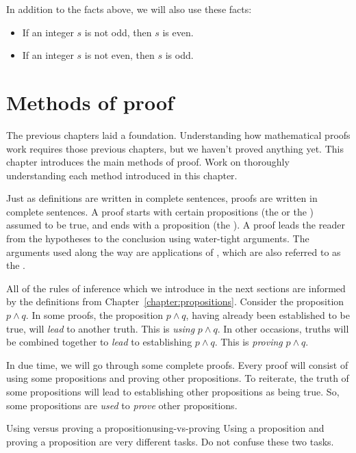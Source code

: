 \documentclass{book}
\theoremstyle{ekimcustom}
\newcommand\defn[1]{{\color{blue}{\bf #1}}}
\begin{document}
In addition to the facts above, we will also use these facts:
\begin{itemize}
\item If an integer $s$ is not odd, then $s$ is even.
\item If an integer $s$ is not even, then $s$ is odd.
\end{itemize}


\chapter{Methods of proof}\label{chapter:methods-of-proof}

The previous chapters laid a foundation. Understanding how mathematical proofs work requires those previous chapters, but we haven't proved anything yet. This chapter introduces the main methods of proof. Work on thoroughly understanding each method introduced in this chapter.

Just as definitions are written in complete sentences, proofs are written in complete sentences. A proof starts with certain propositions (the \defn{hypotheses} or the \defn{premises}) assumed to be true, and ends with a proposition (the \defn{conclusion}). A proof leads the reader from the hypotheses to the conclusion using water-tight arguments. The arguments used along the way are applications of \defn{syllogisms}, which are also referred to as the \defn{rules of inference}.

All of the rules of inference which we introduce in the next sections are informed by the definitions from Chapter~\ref{chapter:propositions}. Consider the proposition $p \wedge q$. In some proofs, the proposition $p \wedge q$, having already been established to be true, will \emph{lead} to another truth. This is \emph{using} $p \wedge q$. In other occasions, truths will be combined together to \emph{lead} to establishing $p \wedge q$. This is \emph{proving} $p \wedge q$.

In due time, we will go through some complete proofs. Every proof will consist of using some propositions and proving other propositions. To reiterate, the truth of some propositions will lead to establishing other propositions as being true. So, some propositions are \emph{used} to \emph{prove} other propositions.
\begin{bwarning}{Using versus proving a proposition}{using-vs-proving}
Using a proposition and proving a proposition are very different tasks. Do not confuse these two tasks.
\end{bwarning}
\end{document}
